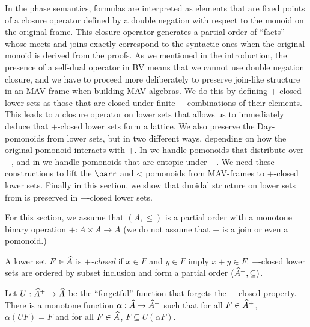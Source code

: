 In the phase semantics, formulas are interpreted as elements that are
fixed points of a closure operator defined by a double negation with
respect to the monoid on the original frame. This closure operator
generates a partial order of ``facts'' whose meets and joins exactly
correspond to the syntactic ones when the original monoid is derived
from the proofs. As we mentioned in the introduction, the presence of
a self-dual operator in BV means that we cannot use double negation
closure, and we have to proceed more deliberately to preserve
join-like structure in an MAV-frame when building MAV-algebras. We do
this by defining $+$-closed lower sets as those that are closed under
finite $+$-combinations of their elements. This leads to a closure
operator on lower sets that allows us to immediately deduce that
$+$-closed lower sets form a lattice. We also preserve the
Day-pomonoids from lower sets, but in two different ways, depending on
how the original pomonoid interacts with $+$. In  we handle pomonoids that distribute
over $+$, and in  we
handle pomonoids that are entopic under $+$. We need these
constructions to lift the $\parr$ and $\lhd$ pomonoids from
MAV-frames to $+$-closed lower sets. Finally in this section, we show
that duoidal structure on lower sets from
 is preserved in $+$-closed lower sets.

For this section, we assume that $(A, \leq)$ is a partial order with a
monotone binary operation $+ : A \times A \to A$ (we do not assume
that $+$ is a join or even a pomonoid.)

\begin{definition}
  A lower set $F \in \widehat{A}$ is \emph{$+$-closed} if $x \in F$
  and $y \in F$ imply $x + y \in F$. $+$-closed lower sets are ordered
  by subset inclusion and form a partial order
  $(\widehat{A}^+, \subseteq)$.
\end{definition}

\begin{proposition}
  Let $U : \widehat{A}^+ \to \widehat{A}$ be the ``forgetful''
  function that forgets the $+$-closed property. There is a monotone
  function $\alpha : \widehat{A} \to \widehat{A}^+$ such that
  for all $F \in \widehat{A}^+$, $\alpha(U F) = F$ and for all
  $F \in \widehat{A}$, $F \subseteq U (\alpha F)$.
\end{proposition}

